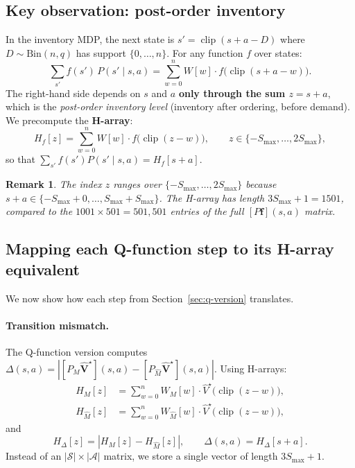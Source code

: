 \documentclass[11pt]{article}
\newcommand{\Smax}{S_{\max}}
\newcommand{\clip}{\operatorname{clip}}
\newcommand{\Vhatstar}{\hat V^\star}
\newtheorem{remark}{Remark}
\begin{document}
\subsection{Key observation: post-order inventory}

In the inventory MDP, the next state is $s' = \clip(s + a - D)$ where
$D \sim \mathrm{Bin}(n, q)$ has support $\{0, \ldots, n\}$.  For any function
$f$ over states:
\begin{equation}\label{eq:h-array-identity}
  \sum_{s'} f(s')\, P(s' \mid s, a)
  = \sum_{w=0}^{n} W[w] \cdot f\bigl(\clip(s + a - w)\bigr).
\end{equation}
The right-hand side depends on $s$ and $a$ \textbf{only through the sum
$z = s + a$}, which is the \emph{post-order inventory level} (inventory after
ordering, before demand).  We precompute the \textbf{H-array}:
\begin{equation}\label{eq:h-array}
  H_f[z] = \sum_{w=0}^{n} W[w] \cdot f\bigl(\clip(z - w)\bigr),
  \qquad z \in \{-\Smax , \ldots , 2\Smax\},
\end{equation}
so that $\sum_{s'} f(s') P(s' \mid s, a) = H_f[s+a]$.

\begin{remark}
The index $z$ ranges over $\{-\Smax, \ldots, 2\Smax\}$ because
$s + a \in \{-\Smax + 0, \ldots, \Smax + \Smax\}$.  The H-array has length
$3\Smax + 1 = 1501$, compared to the $1001 \times 501 = 501{,}501$ entries of
the full $[P \mathbf{f}](s,a)$ matrix.
\end{remark}

\subsection{Mapping each Q-function step to its H-array equivalent}

We now show how each step from Section~\ref{sec:q-version} translates.

\paragraph{Transition mismatch.}
The Q-function version computes $\Delta(s,a) = |[P_M \hat{\mathbf{V}}^\star](s,a) -
[P_{\hat M} \hat{\mathbf{V}}^\star](s,a)|$.  Using H-arrays:
\begin{align}
  H_M[z] &= \sum_{w=0}^{n} W_M[w] \cdot \Vhatstar\bigl(\clip(z-w)\bigr),
  \label{eq:HM} \\
  H_{\hat M}[z] &= \sum_{w=0}^{n} W_{\hat M}[w] \cdot \Vhatstar\bigl(\clip(z-w)\bigr),
  \label{eq:HMhat}
\end{align}
and
\begin{equation}\label{eq:h-delta}
  H_\Delta[z] = |H_M[z] - H_{\hat M}[z]|,
  \qquad
  \Delta(s,a) = H_\Delta[s+a].
\end{equation}
Instead of an $|\mathcal{S}| \times |\mathcal{A}|$ matrix, we store a single
vector of length $3\Smax + 1$.
\end{document}
